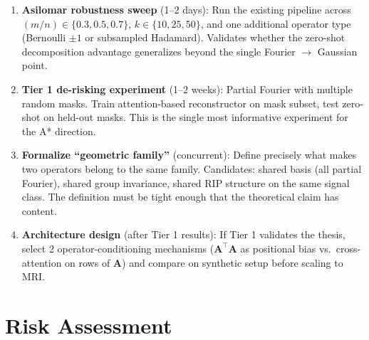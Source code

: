 \documentclass[11pt]{article}
\newcommand{\A}{\mathbf{A}}
\begin{document}
\begin{enumerate}[leftmargin=2em]
    \item \textbf{Asilomar robustness sweep} (1--2 days):
    Run the existing pipeline across $(m/n) \in \{0.3, 0.5, 0.7\}$,
    $k \in \{10, 25, 50\}$, and one additional operator type
    (Bernoulli $\pm 1$ or subsampled Hadamard).
    Validates whether the zero-shot decomposition advantage
    generalizes beyond the single Fourier $\to$ Gaussian point.

    \item \textbf{Tier 1 de-risking experiment} (1--2 weeks):
    Partial Fourier with multiple random masks.
    Train attention-based reconstructor on mask subset,
    test zero-shot on held-out masks.
    This is the single most informative experiment for the A*
    direction.

    \item \textbf{Formalize ``geometric family''} (concurrent):
    Define precisely what makes two operators belong to the
    same family. Candidates: shared basis (all partial Fourier),
    shared group invariance, shared RIP structure on the same
    signal class. The definition must be tight enough that the
    theoretical claim has content.

    \item \textbf{Architecture design} (after Tier 1 results):
    If Tier 1 validates the thesis, select 2 operator-conditioning
    mechanisms ($\A^\top\A$ as positional bias vs.\ cross-attention
    on rows of $\A$) and compare on synthetic setup before
    scaling to MRI.
\end{enumerate}

\section{Risk Assessment}
\label{sec:risk}
\end{document}

